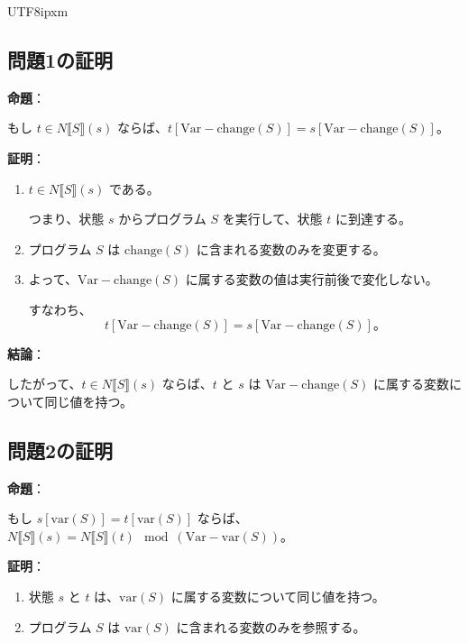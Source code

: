 \documentclass[12pt,a4paper]{article}
\begin{document}
\begin{CJK}{UTF8}{ipxm}
\subsection*{問題1の証明}

\textbf{命題}：

もし $t \in N\llbracket S \rrbracket (s)$ ならば、$t[\text{Var} - \text{change}(S)] = s[\text{Var} - \text{change}(S)]$。

\textbf{証明}：

\begin{enumerate}
    \item $t \in N\llbracket S \rrbracket (s)$ である。

    つまり、状態 $s$ からプログラム $S$ を実行して、状態 $t$ に到達する。

    \item プログラム $S$ は $\text{change}(S)$ に含まれる変数のみを変更する。

    \item よって、$\text{Var} - \text{change}(S)$ に属する変数の値は実行前後で変化しない。

    すなわち、
    \[
    t[\text{Var} - \text{change}(S)] = s[\text{Var} - \text{change}(S)]。
    \]

\end{enumerate}

\textbf{結論}：

したがって、$t \in N\llbracket S \rrbracket (s)$ ならば、$t$ と $s$ は $\text{Var} - \text{change}(S)$ に属する変数について同じ値を持つ。

\vspace{1em}

\subsection*{問題2の証明}

\textbf{命題}：

もし $s[\text{var}(S)] = t[\text{var}(S)]$ ならば、$N\llbracket S \rrbracket (s) = N\llbracket S \rrbracket (t) \mod (\text{Var} - \text{var}(S))$。

\textbf{証明}：

\begin{enumerate}
    \item 状態 $s$ と $t$ は、$\text{var}(S)$ に属する変数について同じ値を持つ。

    \item プログラム $S$ は $\text{var}(S)$ に含まれる変数のみを参照する。


\end{enumerate}
\end{CJK}
\end{document}

